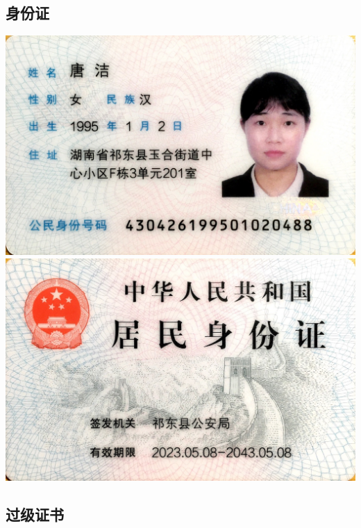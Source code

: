 \documentclass[UFT8]{ctexart}%
\begin{document}
\subsection{身份证}
\begin{center}
  \includegraphics[scale=0.12]{figs/身份证1.JPG }
  \includegraphics[scale=0.12]{figs/身份证2.JPG }
\end{center}







\subsection{过级证书}
\end{document}
